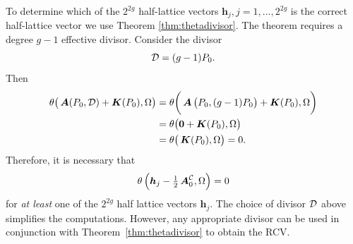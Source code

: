 To determine which of the $2^{2g}$ half-lattice vectors $\boldsymbol{h}_j, j =
1, \ldots, 2^{2g}$ is the correct half-lattice vector we use Theorem
\ref{thm:thetadivisor}. The theorem requires a degree $g-1$ effective divisor.
Consider the divisor
\begin{equation} \label{eqn:simple-effective-divisor}
  \operatorname{\mathcal{D}} = (g-1)P_0.
\end{equation}
Then
\begin{align}
  \theta\big(\operatorname{\boldsymbol{A}}(P_0,\operatorname{\mathcal{D}}) + \operatorname{\boldsymbol{K}}(P_0), \Omega \big) \notag
  &=
  \theta\bigg(\operatorname{\boldsymbol{A}}\big(P_0,(g-1)P_0\big) + \operatorname{\boldsymbol{K}}(P_0), \Omega \bigg) \notag \\
  &=
  \theta\big(\boldsymbol{0} + \operatorname{\boldsymbol{K}}(P_0), \Omega \big) \notag \\
  &=
  \theta\big(\operatorname{\boldsymbol{K}}(P_0), \Omega \big) = 0.
\end{align}
Therefore, it is necessary that
\begin{equation}
  \theta\left(
  \boldsymbol{h}_j - \tfrac{1}{2} \operatorname{\boldsymbol{A}}_0^{\operatorname{\mathcal{C}}}, \Omega
  \right) = 0
\end{equation}
for {\it at least} one of the $2^{2g}$ half lattice vectors $\boldsymbol{h}_j$.
The choice of divisor $\operatorname{\mathcal{D}}$ above simplifies the computations. However, any
appropriate divisor can be used in conjunction with
Theorem~\ref{thm:thetadivisor} to obtain the RCV.



